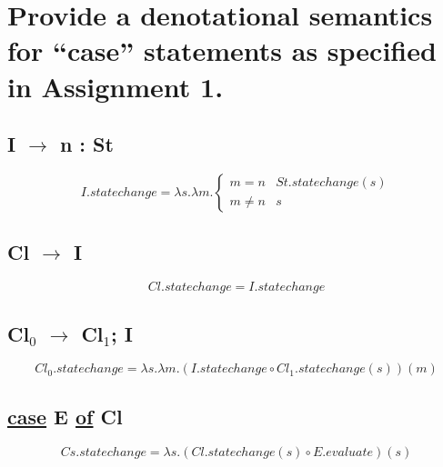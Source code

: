 \section{Provide a denotational semantics for ``case'' statements as specified in Assignment 1.}
\subsection{I $\rightarrow$ n : St}
\begin{equation}
	I.statechange = \lambda s. \lambda m. \left\{
		\begin{array}{rl}
			m = n		& St.statechange( s ) \\
			m \neq n	& s
		\end{array} \right.
\end{equation}

\subsection{Cl $\rightarrow$ I}
\begin{equation}
	Cl.statechange = I.statechange
\end{equation}

\subsection{Cl$_0$ $\rightarrow$ Cl$_1$; I}
\begin{equation}
	Cl_0.statechange = \lambda s. \lambda m. (I.statechange \circ Cl_1.statechange( s ))( m )
\end{equation}

\subsection{\underline{case} E \underline{of} Cl}
\begin{equation}
	Cs.statechange = \lambda s. (Cl.statechange( s ) \circ E.evaluate)( s )
\end{equation}